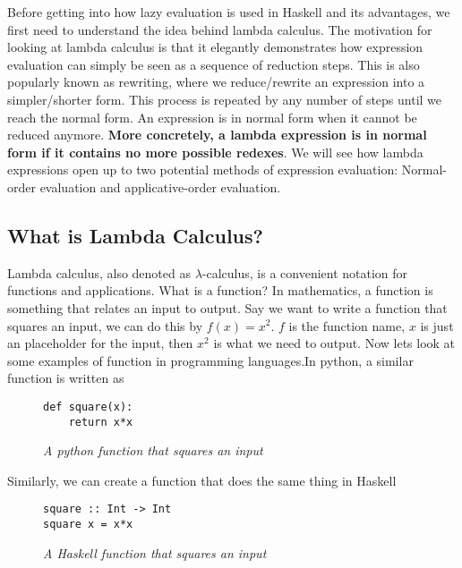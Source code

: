 \documentclass{article}
\begin{document}
\medskip\noindent
Before getting into how lazy evaluation is used in Haskell and its advantages, we first need to understand the idea behind lambda calculus. The motivation for looking at lambda calculus is that it elegantly demonstrates how expression evaluation can simply be seen as a sequence of reduction steps. This is also popularly known as rewriting, where we reduce/rewrite an expression into a simpler/shorter form. This process is repeated by any number of steps until we reach the normal form. An expression is in normal form when it cannot be reduced anymore. \textbf{More concretely, a lambda expression is in normal form if it contains no more possible redexes}. We will see how lambda expressions open up to two potential methods of expression evaluation: Normal-order evaluation and applicative-order evaluation.

\subsection{What is Lambda Calculus?}
Lambda calculus, also denoted as $\lambda$-calculus, is a convenient notation for functions and applications. What is a function? In mathematics, a function is something that relates an input to output. Say we want to write a function that squares an input, we can do this by $f(x) = {x}^2$. $f$ is the function name, $x$ is just an placeholder for the input, then ${x}^2$ is what we need to output. Now lets look at some examples of function in programming languages.In python, a similar function is written as
\begin{figure}[!htb]
    \begin{lstlisting}
def square(x):
    return x*x
    \end{lstlisting}
    \caption{\textit{A python function that squares an input}}
\end{figure}

\medskip\noindent
Similarly, we can create a function that does the same thing in Haskell

\begin{figure}[H]
    \begin{lstlisting}
square :: Int -> Int
square x = x*x
    \end{lstlisting}
    \caption{\textit{A Haskell function that squares an input}}
\end{figure}
\end{document}
